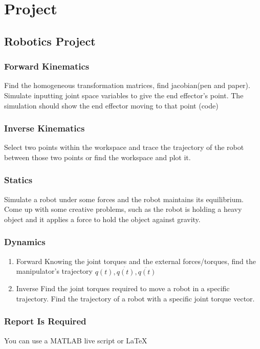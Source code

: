\documentclass[11pt]{report}
\begin{document}
\part{Project}
\label{sec:org741c28b}
\chapter{Robotics Project}
\label{sec:orgdab67c9}
\section{Forward Kinematics}
\label{sec:org5b8c9aa}
Find the homogeneous transformation matrices, find jacobian(pen and paper). Simulate inputting joint space variables to give the end effector's point. The simulation should show the end effector moving to that point (code)
\section{Inverse Kinematics}
\label{sec:org7d4286b}
Select two points within the workspace and trace the trajectory of the robot between those two points or find the workspace and plot it.
\section{Statics}
\label{sec:org1427f62}
Simulate a robot under some forces and the robot maintains its equilibrium. Come up with some creative problems, such as the robot is holding a heavy object and it applies a force to hold the object against gravity.
\section{Dynamics}
\label{sec:org973838c}
\begin{enumerate}
\item Forward
\label{sec:org6ca9748}
Knowing the joint torques and the external forces/torques, find the manipulator's trajectory \(q(t),\dot{q(t)}, \ddot{q(t)}\)
\item Inverse
\label{sec:org5e7c779}
Find the joint torques required to move a robot in a specific trajectory. Find the trajectory of a robot with a specific joint torque vector.
\end{enumerate}
\section{Report Is Required}
\label{sec:org73cba2b}
You can use a MATLAB live script or \LaTeX{}
\end{document}
